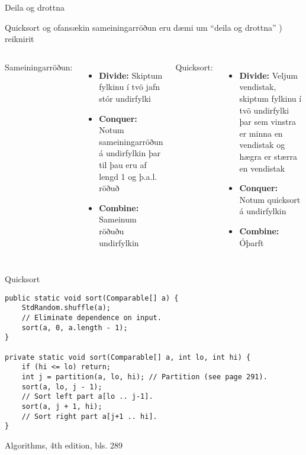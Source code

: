 \documentclass{beamer}
\begin{document}
\begin{frame}{Deila og drottna}
	\begin{center}
		Quicksort og ofansækin sameiningarröðun eru dæmi um ``deila og drottna'' ) reiknirit
	\end{center}
	\begin{columns}
		Sameiningarröðun:
		\begin{itemize}
			\item[] \textbf{Divide:} Skiptum fylkinu í tvö jafn stór undirfylki
			\item[] \textbf{Conquer:} Notum sameiningarröðun á undirfylkin þar til þau eru af lengd 1 og þ.a.l. röðuð
			\item[] \textbf{Combine:} Sameinum röðuðu undirfylkin
		\end{itemize}
		Quicksort:
		\begin{itemize}
			\item[] \textbf{Divide:} Veljum vendistak, skiptum fylkinu í tvö undirfylki þar sem vinstra er minna en vendistak og hægra er stærra en vendistak
			\item[] \textbf{Conquer:} Notum quicksort á undirfylkin
			\item[] \textbf{Combine:} Óþarft
		\end{itemize}
	\end{columns}
\end{frame}

\headonly

\begin{frame}[fragile]{Quicksort}
	\vspace{0.5cm}
	\begin{verbatim}
public static void sort(Comparable[] a) {
    StdRandom.shuffle(a);
    // Eliminate dependence on input.
    sort(a, 0, a.length - 1);
}

private static void sort(Comparable[] a, int lo, int hi) {
    if (hi <= lo) return;
    int j = partition(a, lo, hi); // Partition (see page 291).
    sort(a, lo, j - 1);
    // Sort left part a[lo .. j-1].
    sort(a, j + 1, hi);
    // Sort right part a[j+1 .. hi].
}
    \end{verbatim}
	\begin{center}
		Algorithms, 4th edition, bls. 289
	\end{center}
\end{frame}
\end{document}
